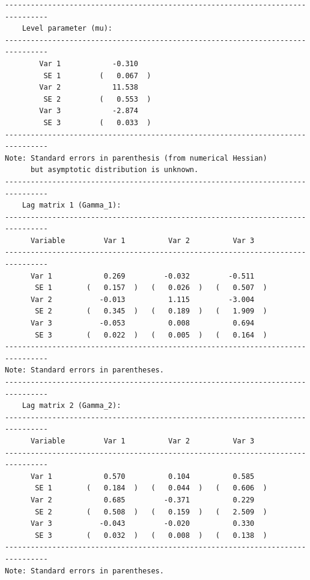 \documentclass[article]{jss}
\begin{document}
\begin{verbatim}
--------------------------------------------------------------------------------
    Level parameter (mu):                                                                         
--------------------------------------------------------------------------------
        Var 1            -0.310     
         SE 1         (   0.067  )  
        Var 2            11.538     
         SE 2         (   0.553  )  
        Var 3            -2.874     
         SE 3         (   0.033  )  
--------------------------------------------------------------------------------
Note: Standard errors in parenthesis (from numerical Hessian) 
      but asymptotic distribution is unknown. 
--------------------------------------------------------------------------------
    Lag matrix 1 (Gamma_1):                                                                            
--------------------------------------------------------------------------------
      Variable         Var 1          Var 2          Var 3   
--------------------------------------------------------------------------------
      Var 1            0.269         -0.032         -0.511    
       SE 1        (   0.157  )   (   0.026  )   (   0.507  )  
      Var 2           -0.013          1.115         -3.004    
       SE 2        (   0.345  )   (   0.189  )   (   1.909  )  
      Var 3           -0.053          0.008          0.694    
       SE 3        (   0.022  )   (   0.005  )   (   0.164  )  
--------------------------------------------------------------------------------
Note: Standard errors in parentheses.                                                                
--------------------------------------------------------------------------------
    Lag matrix 2 (Gamma_2):                                                                            
--------------------------------------------------------------------------------
      Variable         Var 1          Var 2          Var 3   
--------------------------------------------------------------------------------
      Var 1            0.570          0.104          0.585    
       SE 1        (   0.184  )   (   0.044  )   (   0.606  )  
      Var 2            0.685         -0.371          0.229    
       SE 2        (   0.508  )   (   0.159  )   (   2.509  )  
      Var 3           -0.043         -0.020          0.330    
       SE 3        (   0.032  )   (   0.008  )   (   0.138  )  
--------------------------------------------------------------------------------
Note: Standard errors in parentheses.                                                                

\end{verbatim}
\end{document}
